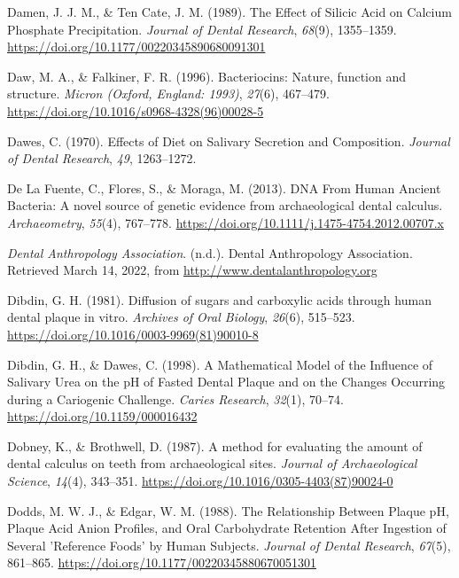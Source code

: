 \documentclass[
  letterpaper,
]{book}
\newlength{\cslhangindent}
\newlength{\cslentryspacingunit} %
\newenvironment{CSLReferences}[2] %
 {%
  \setlength{\parindent}{0pt}
  \ifodd #1
  \let\oldpar\par
  \def\par{\hangindent=\cslhangindent\oldpar}
  \fi
  \setlength{\parskip}{#2\cslentryspacingunit}
 }%
 {}
\begin{document}
\begin{CSLReferences}{1}{0}
\leavevmode{}%
Damen, J. J. M., \& Ten Cate, J. M. (1989). The {Effect} of {Silicic
Acid} on {Calcium Phosphate Precipitation}. \emph{Journal of Dental
Research}, \emph{68}(9), 1355--1359.
\url{https://doi.org/10.1177/00220345890680091301}

\leavevmode{}%
Daw, M. A., \& Falkiner, F. R. (1996). Bacteriocins: Nature, function
and structure. \emph{Micron (Oxford, England: 1993)}, \emph{27}(6),
467--479. \url{https://doi.org/10.1016/s0968-4328(96)00028-5}

\leavevmode{}%
Dawes, C. (1970). Effects of {Diet} on {Salivary Secretion} and
{Composition}. \emph{Journal of Dental Research}, \emph{49}, 1263--1272.

\leavevmode{}%
De La Fuente, C., Flores, S., \& Moraga, M. (2013). {DNA From Human
Ancient Bacteria}: {A} novel source of genetic evidence from
archaeological dental calculus. \emph{Archaeometry}, \emph{55}(4),
767--778. \url{https://doi.org/10.1111/j.1475-4754.2012.00707.x}

\leavevmode{}%
\emph{Dental {Anthropology Association}}. (n.d.). {Dental Anthropology
Association}. Retrieved March 14, 2022, from
\url{http://www.dentalanthropology.org}

\leavevmode{}%
Dibdin, G. H. (1981). Diffusion of sugars and carboxylic acids through
human dental plaque in vitro. \emph{Archives of Oral Biology},
\emph{26}(6), 515--523.
\url{https://doi.org/10.1016/0003-9969(81)90010-8}

\leavevmode{}%
Dibdin, G. H., \& Dawes, C. (1998). A {Mathematical Model} of the
{Influence} of {Salivary Urea} on the {pH} of {Fasted Dental Plaque} and
on the {Changes Occurring} during a {Cariogenic Challenge}. \emph{Caries
Research}, \emph{32}(1), 70--74. \url{https://doi.org/10.1159/000016432}

\leavevmode{}%
Dobney, K., \& Brothwell, D. (1987). A method for evaluating the amount
of dental calculus on teeth from archaeological sites. \emph{Journal of
Archaeological Science}, \emph{14}(4), 343--351.
\url{https://doi.org/10.1016/0305-4403(87)90024-0}

\leavevmode{}%
Dodds, M. W. J., \& Edgar, W. M. (1988). The {Relationship Between
Plaque pH}, {Plaque Acid Anion Profiles}, and {Oral Carbohydrate
Retention After Ingestion} of {Several} '{Reference Foods}' by {Human
Subjects}. \emph{Journal of Dental Research}, \emph{67}(5), 861--865.
\url{https://doi.org/10.1177/00220345880670051301}


\end{CSLReferences}
\end{document}
